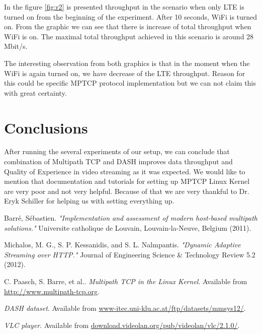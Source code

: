 \documentclass{llncs}
\begin{document}
In the figure \ref{fig:r2} is presented throughput in the scenario when only LTE is turned on from the beginning of the experiment. After 10 seconds, WiFi is turned on. From the graphic we can see that there is increase of total throughput when WiFi is on. The maximal total throughput achieved in this scenario is around 28 Mbit/s.

The interesting observation from both graphics is that in the moment when the WiFi is again turned on, we have decrease of the LTE throughput. Reason for this could be specific MPTCP protocol implementation but we can not claim this with great certainty.


\section{Conclusions}
After running the several experiments of our setup, we can conclude that combination of Multipath TCP and DASH improves data throughput and Quality of Experience in video streaming as it was expected. We would like to mention that documentation and tutorials for setting up MPTCP Linux Kernel \cite{linuxMPTCP} are very poor and not very helpful. Because of that we are very thankful to Dr. Eryk Schiller for helping us with setting everything up. 



\begin{thebibliography}{1}
Barré, Sébastien. \emph{"Implementation and assessment of modern host-based multipath solutions." } Universite catholique de Louvain, Louvain-la-Neuve, Belgium (2011).

Michalos, M. G., S. P. Kessanidis, and S. L. Nalmpantis. \emph{"Dynamic Adaptive Streaming over HTTP."} Journal of Engineering Science \& Technology Review 5.2 (2012).

C. Paasch, S. Barre, et al.. \emph{Multipath TCP in the Linux Kernel}. Available from \url{http://www.multipath-tcp.org}.

\emph{DASH dataset}. Available from \url{www-itec.uni-klu.ac.at/ftp/datasets/mmsys12/}.

\emph{VLC player}. Available from \url{download.videolan.org/pub/videolan/vlc/2.1.0/}.

\end{thebibliography}
\end{document}
